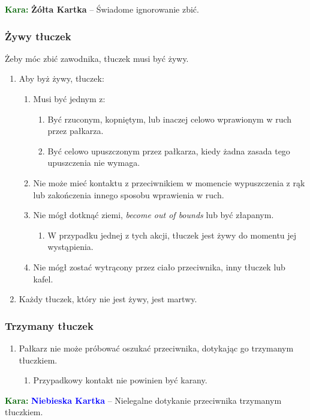 \documentclass[11pt,a4paper]{article}
\newcommand\yellowcard[1]{\bgroup\textcolor{darkgreen}{\textbf{Kara: }}\bgroup\textcolor{darkyellow}{\textbf{Żółta Kartka}} -- #1}
\newcommand\bluecard[1]{\bgroup\textcolor{darkgreen}{\textbf{Kara: }}\bgroup\textcolor{blue}{\textbf{Niebieska Kartka}} -- #1}
\begin{document}
\yellowcard{Świadome ignorowanie zbić.}

\subsubsection{Żywy tłuczek}
Żeby móc zbić zawodnika, tłuczek musi być żywy.
\begin{enumerate}
  \item Aby byż żywy, tłuczek:
  \begin{enumerate}
    \item Musi być jednym z:
    \begin{enumerate}
      \item Być rzuconym, kopniętym, lub inaczej celowo wprawionym w ruch przez pałkarza.
      \item Być celowo upuszczonym przez pałkarza, kiedy żadna zasada tego upuszczenia nie wymaga.
    \end{enumerate}
    \item Nie może mieć kontaktu z przeciwnikiem w momencie wypuszczenia z rąk lub zakończenia innego sposobu wprawienia w ruch.
    \item Nie mógł dotknąć ziemi, \emph{become out of bounds} lub być złapanym.
    \begin{enumerate}
      \item W przypadku jednej z tych akcji, tłuczek jest żywy do momentu jej wystąpienia.
    \end{enumerate}
    \item Nie mógł zostać wytrącony przez ciało przeciwnika, inny tłuczek lub kafel.
  \end{enumerate}
  \item Każdy tłuczek, który nie jest żywy, jest martwy.
\end{enumerate}

\subsubsection{Trzymany tłuczek}
\begin{enumerate}
  \item Pałkarz nie może próbować oszukać przeciwnika, dotykając go trzymanym tłuczkiem.
  \begin{enumerate}
    \item Przypadkowy kontakt nie powinien być karany.
  \end{enumerate}
\end{enumerate}

\bluecard{Nielegalne dotykanie przeciwnika trzymanym tłuczkiem.}
\end{document}
